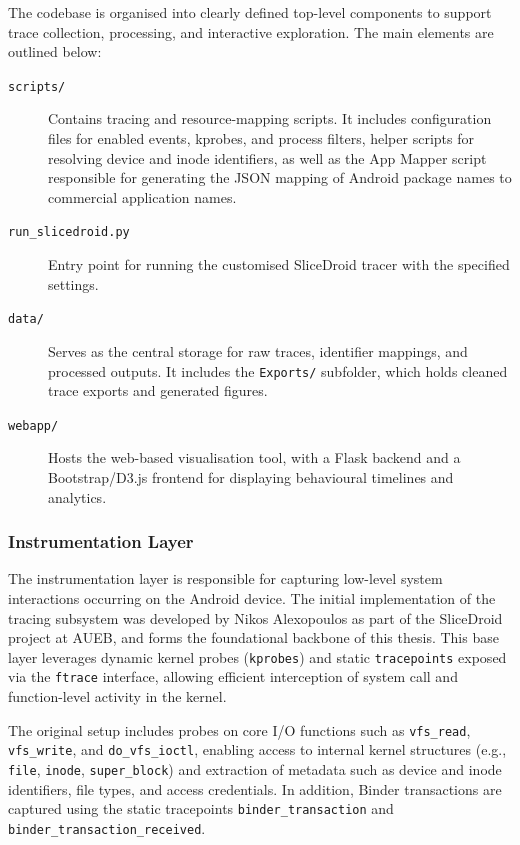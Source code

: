 \documentclass[a4paper,12pt]{report}
\begin{document}
The codebase is organised into clearly defined top-level components to support trace collection, processing, and interactive exploration. The main elements are outlined below:

\begin{description}
  \item[\texttt{scripts/}] Contains tracing and resource-mapping scripts. It includes configuration files for enabled events, kprobes, and process filters, helper scripts for resolving device and inode identifiers, as well as the App Mapper script responsible for generating the JSON mapping of Android package names to commercial application names.

  \item[\texttt{run\_slicedroid.py}] Entry point for running the customised SliceDroid tracer with the specified settings.

  \item[\texttt{data/}] Serves as the central storage for raw traces, identifier mappings, and processed outputs. It includes the \texttt{Exports/} subfolder, which holds cleaned trace exports and generated figures.

  \item[\texttt{webapp/}] Hosts the web-based visualisation tool, with a Flask backend and a Bootstrap/D3.js frontend for displaying behavioural timelines and analytics.
\end{description}

\subsubsection{Instrumentation Layer}

The instrumentation layer is responsible for capturing low-level system interactions occurring on the Android device. The initial implementation of the tracing subsystem was developed by Nikos Alexopoulos as part of the SliceDroid project at AUEB, and forms the foundational backbone of this thesis. This base layer leverages dynamic kernel probes (\texttt{kprobes}) and static \texttt{tracepoints} exposed via the \texttt{ftrace} interface, allowing efficient interception of system call and function-level activity in the kernel.

The original setup includes probes on core I/O functions such as \texttt{vfs\_read}, \texttt{vfs\_write}, and \texttt{do\_vfs\_ioctl}, enabling access to internal kernel structures (e.g., \texttt{file}, \texttt{inode}, \texttt{super\_block}) and extraction of metadata such as device and inode identifiers, file types, and access credentials. In addition, Binder transactions are captured using the static tracepoints \texttt{binder\_transaction} and \texttt{binder\_transaction\_received}.
\end{document}
